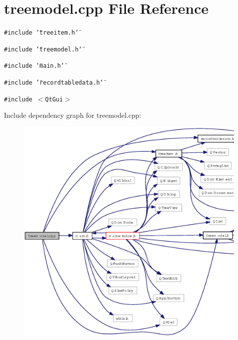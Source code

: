 \section{treemodel.cpp File Reference}
\label{treemodel_8cpp}
{\tt \#include \char`\"{}treeitem.h\char`\"{}}\par
{\tt \#include \char`\"{}treemodel.h\char`\"{}}\par
{\tt \#include \char`\"{}main.h\char`\"{}}\par
{\tt \#include \char`\"{}recordtabledata.h\char`\"{}}\par
{\tt \#include $<$Qt\-Gui$>$}\par


Include dependency graph for treemodel.cpp:\begin{figure}[H]
\begin{center}
\leavevmode
\includegraphics[width=383pt]{treemodel_8cpp__incl}
\end{center}
\end{figure}
